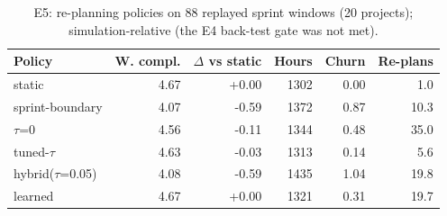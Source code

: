 \begin{table}[t]
\centering
\small
\caption{E5: re-planning policies on 88 replayed sprint windows (20 projects); simulation-relative (the E4 back-test gate was not met).}
\label{tab:e5}
\begin{tabular}{lrrrrr}
\toprule
Policy & W. compl. & $\Delta$ vs static & Hours & Churn & Re-plans \\
\midrule
static & 4.67 & +0.00 & 1302 & 0.00 & 1.0 \\
sprint-boundary & 4.07 & -0.59 & 1372 & 0.87 & 10.3 \\
$\tau$=0 & 4.56 & -0.11 & 1344 & 0.48 & 35.0 \\
tuned-$\tau$ & 4.63 & -0.03 & 1313 & 0.14 & 5.6 \\
hybrid($\tau$=0.05) & 4.08 & -0.59 & 1435 & 1.04 & 19.8 \\
learned & 4.67 & +0.00 & 1321 & 0.31 & 19.7 \\
\bottomrule
\end{tabular}
\end{table}
